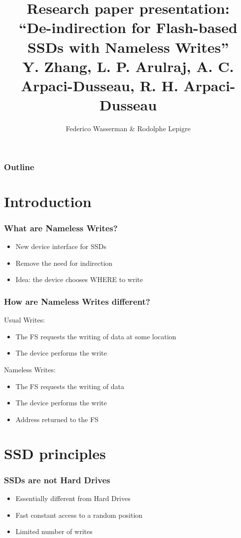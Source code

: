 \documentclass{beamer}
\title[\insertframenumber/\inserttotalframenumber]
      {Research paper presentation:\\
       ``De-indirection for Flash-based SSDs with Nameless Writes''\\
       \small{Y. Zhang, L. P. Arulraj, A. C. Arpaci-Dusseau, R. H. Arpaci-Dusseau}}
\author{Federico Wasserman \& Rodolphe Lepigre}
\institute{MOSIG - Parallel, Distributed and Embedded Systems}
\begin{document}
\begin{frame}
\titlepage
\end{frame}

\begin{frame}
  \frametitle{Outline}
  \tableofcontents[hideallsubsections]
\end{frame}

\section{Introduction}
\begin{frame}
  \frametitle{What are Nameless Writes?}
  \begin{itemize}
    \item New device interface for SSDs
    \item Remove the need for indirection
    \item Idea: the device chooses WHERE to write
  \end{itemize}
\end{frame}

\begin{frame}
  \frametitle{How are Nameless Writes different?}
  Usual Writes:
  \begin{itemize}
    \item The FS requests the writing of data at some location
    \item The device performs the write
  \end{itemize}

  Nameless Writes:
  \begin{itemize}
    \item The FS requests the writing of data
    \item The device performs the write
    \item Address returned to the FS
  \end{itemize}
\end{frame}

\section{SSD principles}
\begin{frame}
  \frametitle{SSDs are not Hard Drives}
  \begin{itemize}
    \item Essentially different from Hard Drives
    \item Fast constant access to a random position
    \item Limited number of writes
  \end{itemize}
\end{frame}
\end{document}
